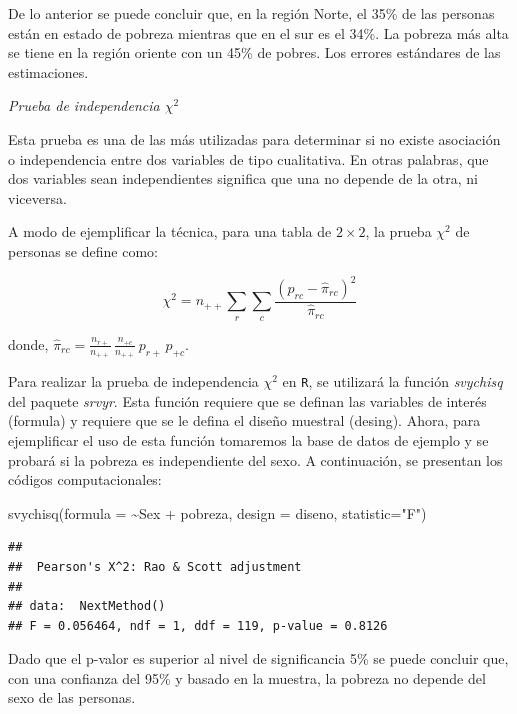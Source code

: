 \documentclass[
  12pt,
]{book}
\newenvironment{Shaded}{\begin{snugshade}}{\end{snugshade}}
\newcommand{\AttributeTok}[1]{\textcolor[rgb]{0.77,0.63,0.00}{#1}}
\newcommand{\FunctionTok}[1]{\textcolor[rgb]{0.00,0.00,0.00}{#1}}
\newcommand{\NormalTok}[1]{#1}
\newcommand{\SpecialCharTok}[1]{\textcolor[rgb]{0.00,0.00,0.00}{#1}}
\newcommand{\StringTok}[1]{\textcolor[rgb]{0.31,0.60,0.02}{#1}}
\begin{document}
De lo anterior se puede concluir que, en la región Norte, el 35\% de las personas están en estado de pobreza mientras que en el sur es el 34\%. La pobreza más alta se tiene en la región oriente con un 45\% de pobres. Los errores estándares de las estimaciones.

\emph{Prueba de independencia \(\chi^{2}\)}

Esta prueba es una de las más utilizadas para determinar si no existe asociación o independencia entre dos variables de tipo cualitativa. En otras palabras, que dos variables sean independientes significa que una no depende de la otra, ni viceversa.

A modo de ejemplificar la técnica, para una tabla de \(2\times2\), la prueba \(\chi^{2}\) de personas se define como:

\[
\chi^{2}  =  n_{++}\sum_{r}\sum_{c}\frac{\left(p_{rc}-\hat{\pi}_{rc}\right)^{2}}{\hat{\pi}_{rc}}
\]

donde, \(\hat{\pi}_{rc}=\frac{n_{r+}}{n_{++}}\,\frac{n_{+c}}{n_{++}}\,p_{r+}\,p_{+c}\).

Para realizar la prueba de independencia \(\chi^{2}\) en \texttt{R}, se utilizará la función \emph{svychisq} del paquete \emph{srvyr}. Esta función requiere que se definan las variables de interés (formula) y requiere que se le defina el diseño muestral (desing). Ahora, para ejemplificar el uso de esta función tomaremos la base de datos de ejemplo y se probará si la pobreza es independiente del sexo. A continuación, se presentan los códigos computacionales:

\begin{Shaded}
\begin{Highlighting}[]
\FunctionTok{svychisq}\NormalTok{(}\AttributeTok{formula =} \SpecialCharTok{\textasciitilde{}}\NormalTok{Sex }\SpecialCharTok{+}\NormalTok{ pobreza, }\AttributeTok{design =}\NormalTok{ diseno, }\AttributeTok{statistic=}\StringTok{"F"}\NormalTok{)}
\end{Highlighting}
\end{Shaded}

\begin{verbatim}
## 
##  Pearson's X^2: Rao & Scott adjustment
## 
## data:  NextMethod()
## F = 0.056464, ndf = 1, ddf = 119, p-value = 0.8126
\end{verbatim}

Dado que el p-valor es superior al nivel de significancia 5\% se puede concluir que, con una confianza del 95\% y basado en la muestra, la pobreza no depende del sexo de las personas.
\end{document}
